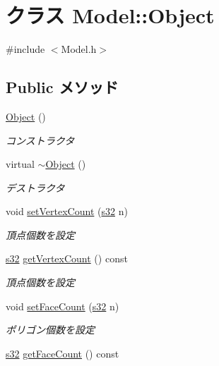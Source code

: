 \hypertarget{class_model_1_1_object}{\section{クラス Model\-:\-:Object}
\label{class_model_1_1_object}
}


{\ttfamily \#include $<$Model.\-h$>$}

\subsection*{Public メソッド}
\begin{DoxyCompactItemize}
\item 
\hyperlink{class_model_1_1_object_abbdb34603d3535cb21979daa5e10fe3b}{Object} ()
\begin{DoxyCompactList}\small\item\em コンストラクタ \end{DoxyCompactList}\item 
virtual \hyperlink{class_model_1_1_object_a05da6db6a0bfad6200241c3b2c069383}{$\sim$\-Object} ()
\begin{DoxyCompactList}\small\item\em デストラクタ \end{DoxyCompactList}\item 
void \hyperlink{class_model_1_1_object_a8d7b5dca571d0392adf79fde1cecbbbc}{set\-Vertex\-Count} (\hyperlink{_main_8h_a0ce6887c26c1c49ad3be5710dd42bfd6}{s32} n)
\begin{DoxyCompactList}\small\item\em 頂点個数を設定 \end{DoxyCompactList}\item 
\hyperlink{_main_8h_a0ce6887c26c1c49ad3be5710dd42bfd6}{s32} \hyperlink{class_model_1_1_object_a2bfe2377eb90acde7aac88f5c3ef16ab}{get\-Vertex\-Count} () const 
\begin{DoxyCompactList}\small\item\em 頂点個数を設定 \end{DoxyCompactList}\item 
void \hyperlink{class_model_1_1_object_acd752ebee5c69a88667f3e534bd15472}{set\-Face\-Count} (\hyperlink{_main_8h_a0ce6887c26c1c49ad3be5710dd42bfd6}{s32} n)
\begin{DoxyCompactList}\small\item\em ポリゴン個数を設定 \end{DoxyCompactList}\item 
\hyperlink{_main_8h_a0ce6887c26c1c49ad3be5710dd42bfd6}{s32} \hyperlink{class_model_1_1_object_a531ac8a65ef2c03c783abeceaaf4c434}{get\-Face\-Count} () const 

\end{DoxyCompactItemize}
